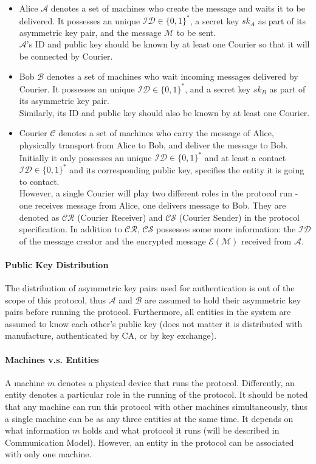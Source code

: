 \documentclass[10pt,a4paper]{article}
\begin{document}
\begin{itemize}
\item Alice $\mathcal{A}$ denotes a set of machines who create the message and waits it to be delivered. It possesses an unique $\mathcal{ID} \in \{0, 1\}^*$, a secret key $sk_A$ as part of its asymmetric key pair, and the message $\mathcal{M}$ to be sent. \\
$\mathcal{A}$'s ID and public key should be known by at least one Courier so that it will be connected by Courier.

\item Bob $\mathcal{B}$ denotes a set of machines who wait incoming messages delivered by Courier. It possesses an unique $\mathcal{ID} \in \{0, 1\}^*$, and a secret key $sk_B$ as part of its asymmetric key pair.\\
Similarly, its ID and public key should also be known by at least one Courier.

\item Courier $\mathcal{C}$ denotes a set of machines who carry the message of Alice, physically transport from Alice to Bob, and deliver the message to Bob. Initially it only possesses an unique $\mathcal{ID} \in \{0, 1\}^*$ and at least a contact $\mathcal{ID} \in \{0, 1\}^*$ and its corresponding public key, specifies the entity it is going to contact.\\
However, a single Courier will play two different roles in the protocol run - one receives message from Alice, one delivers message to Bob. They are denoted as $\mathcal{CR}$ (Courier Receiver) and $\mathcal{CS}$ (Courier Sender) in the protocol specification. In addition to $\mathcal{CR}$, $\mathcal{CS}$ possesses some more information: the $\mathcal{ID}$ of the message creator and the encrypted message $\mathcal{E(M)}$ received from $\mathcal{A}$.
\end{itemize}

\paragraph{Public Key Distribution}
The distribution of asymmetric key pairs used for authentication is out of the scope of this protocol, thus $\mathcal{A}$ and $\mathcal{B}$ are assumed to hold their asymmetric key pairs before running the protocol. Furthermore, all entities in the system are assumed to know each other's public key (does not matter it is distributed with manufacture, authenticated by CA, or by key exchange).

\paragraph{Machines v.s. Entities}
A machine $m$ denotes a physical device that runs the protocol. Differently, an entity denotes a particular role in the running of the protocol. It should be noted that any  machine can run this protocol with other machines simultaneously, thus a single machine can be as any three entities at the same time. It depends on what information $m$ holds and what protocol it runs (will be described in Communication Model). However, an entity in the protocol can be associated with only one machine.
\end{document}
